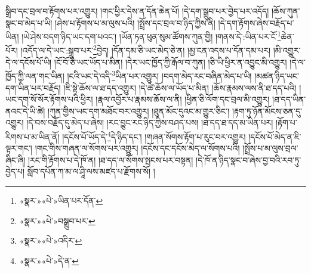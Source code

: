 སྒྲིབ་དང་བྲལ་བ་རྟོགས་པར་འགྱུར། །གང་ཕྱིར་དེས་ན་དོན་ཆེན་པོ། །དེ་དག་སྒྲུབ་པར་བྱེད་པར་འདོད། །ཆོས་ཀུན་སྣང་བ་མེད་པ་ཡི། །ཤེས་པ་རྟོགས་པ་མ་ལུས་པའི། །སྤྲོས་དང་བྲལ་བ་ཉིད་ཀྱིས་ནི། །དེ་དག་རྟོགས་ཞེས་བརྗོད་པ་ཡིན། །ཡེ་ཤེས་བདག་ཉིད་ཡང་དག་པའང་། །ཡོན་ཏན་ཕུན་སུམ་ཚོགས་ཀུན་གྱི། །གནས་དེ་:ཡིན་པར་ངོ་\footnote{«སྣར་»«པེ་»ཡིན་པར་དོན་}ཆེན་པོར། །འདོད་ལ་དེ་ཡང་:སྒྲུབ་པར་\footnote{«སྣར་»«པེ་»བསྒྲུབ་པར་}བྱེད། །དོན་དམ་ཅི་ཡང་མེད་ཅེ་ན། །མྱ་ངན་འདས་པ་དོན་དམ་པར། །མི་འགྱུར་དེ་ལ་དངོས་པོ་ཡི། །ངོ་བོ་ཅི་ཡང་ཡོད་པ་མིན། །དེར་ཡང་ཁྱོད་ཀྱི་རྒོལ་བ་ཀུན། །ཅི་ཡི་ཕྱིར་ན་འབྱུང་མི་འགྱུར། །དེ་ལ་ཁྱོད་ཀྱི་ལན་གང་ཡིན། །ངའི་ཡང་དེ་འདི་\footnote{«སྣར་»«པེ་»འདིར་}ཡིན་པར་འགྱུར། །བདག་མེད་རང་བཞིན་མེད་པ་ཡི། །མཚན་ཉིད་ཡང་དག་ཡིན་པར་བརྗོད། །ཇི་སྟེ་ཆོས་ལ་ཐ་དད་འགྱུར། །དེ་ཚེ་ཆོས་ལ་ཡོད་པ་མིན། །ཆོས་རྣམས་ལས་ནི་ཐ་དད་པའི། །ཡང་དག་སོ་སོར་རྟོགས་པའི་ཕྱིར། །རྣལ་འབྱོར་པ་རྣམས་ཆོས་ལ་ནི། །ཕྱིན་ཅི་ལོག་དང་བྲལ་མི་འགྱུར། །ཐ་དད་ཡིན་ནའང་དེ་ཡི་ཚེ། །ཀུན་གྱིས་ཡང་དག་མཐོང་བར་འགྱུར། །ཐུན་མོང་དུའང་མ་གྱུར་ཅིང་། །རྟག་ཏུ་ཉོན་མོངས་ཅན་དུ་འགྱུར། །དེ་བས་བརྗོད་དུ་མེད་པ་ཞེས། །རང་བྱུང་རང་ཉིད་ཀྱིས་བཤད་པས། །ཐ་དད་ཐ་དད་མ་ཡིན་པར། །རྟོག་པ་རིགས་པ་མ་ཡིན་ནོ། །དངོས་པོ་ཡོད་དེ་\footnote{«སྣར་»«པེ་»དེ་ན་}དེ་ཉིད་དང་། །གཞན་སོགས་རྟོག་པ་རུང་བར་འགྱུར། །དངོས་པོ་མེད་ན་ཇི་ལྟར་གང་། །གང་གིས་གཞན་ལ་སོགས་པར་འགྱུར། །དངོས་དང་དངོས་མེད་ལ་སོགས་པའི། །སྤྲོས་པ་མ་ལུས་བྲལ་ཞིང་ཞི། །རང་གི་རྟོགས་པ་དེ་ཁོ་ན། །ཐ་དད་ལ་སོགས་སྤངས་པར་བསྟན། །དེ་ཁོ་ན་ཉིད་སྣང་བ་ཞེས་བྱ་བའི་རབ་ཏུ་བྱེད་པ། སློབ་དཔོན་ཀ་མ་ལ་ཤཱི་ལས་མཛད་པ་རྫོགས་སོ། ། 